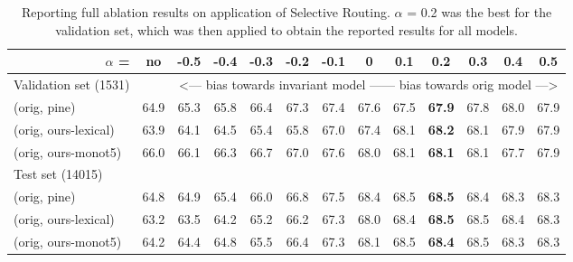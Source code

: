 \begin{table*}[!t]

\resizebox{\linewidth}{!}
{

\begin{tabular}{@{}lcccccccccccc@{}}
\toprule

\multicolumn{1}{r|}{$\alpha$ =}                         & no \sr{} & -0.5    & -0.4    & -0.3    & -0.2    & -0.1    & 0       & 0.1     & \textbf{0.2}     & 0.3    & 0.4    & 0.5    \\ \midrule
Validation set (1531)                        &        & \multicolumn{11}{c}{\textless{}--- bias towards invariant model ------ bias towards orig model ---\textgreater{}} \\ \midrule
\multicolumn{1}{l|}{\sr{} (orig, pine)}         & 64.9   & 65.3    & 65.8    & 66.4    & 67.3    & 67.4    & 67.6    & 67.5    & \textbf{67.9}    & 67.8   & 68.0   & 67.9   \\
\multicolumn{1}{l|}{\sr{} (orig, ours-lexical)} & 63.9   & 64.1    & 64.5    & 65.4    & 65.8    & 67.0    & 67.4    & 68.1    & \textbf{68.2}    & 68.1   & 67.9   & 67.9   \\
\multicolumn{1}{l|}{\sr{} (orig, ours-monot5)}  & 66.0   & 66.1    & 66.3    & 66.7    & 67.0    & 67.6    & 68.0    & 68.1    & \textbf{68.1}    & 68.1   & 67.7   & 67.9   \\ \midrule
Test set (14015)                             &        &         &         &         &         &         &         &         & \textbf{}        &        &        &        \\ \midrule
\multicolumn{1}{l|}{\sr{} (orig, pine)}         & 64.8   & 64.9    & 65.4    & 66.0    & 66.8    & 67.5    & 68.4    & 68.5    & \textbf{68.5}    & 68.4   & 68.3   & 68.3   \\
\multicolumn{1}{l|}{\sr{} (orig, ours-lexical)} & 63.2   & 63.5    & 64.2    & 65.2    & 66.2    & 67.3    & 68.0    & 68.4    & \textbf{68.5}    & 68.5   & 68.4   & 68.3   \\
\multicolumn{1}{l|}{\sr{} (orig, ours-monot5)}  & 64.2   & 64.4    & 64.8    & 65.5    & 66.4    & 67.3    & 68.1    & 68.5    & \textbf{68.4}    & 68.5   & 68.3   & 68.3   \\ \bottomrule
\end{tabular}

}

\caption{Reporting full ablation results on application of Selective Routing. $\alpha$ = 0.2 was the best for the validation set, which was then applied to obtain the reported results for all models.}
\label{table/mov_alpha_ablation}

\end{table*}
